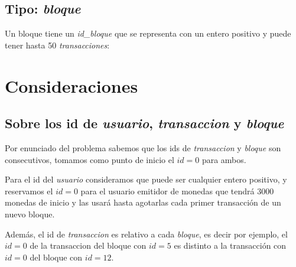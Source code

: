 \documentclass[10pt,a4paper]{article}
\begin{document}
    \subsection{Tipo: \textit{bloque}}
    Un bloque tiene un \textit{id\_bloque} que se representa con un entero positivo y puede tener hasta 50 \textit{transacciones}:

    \vspace{0.3cm}
    \noindent
    \vspace{0.1cm}

    \section{Consideraciones}
    \subsection{Sobre los id de \textit{usuario}, \textit{transaccion} y \textit{bloque}}
    Por enunciado del problema sabemos que los ids de \textit{transaccion} y \textit{bloque} son consecutivos, tomamos como punto de inicio el $id = 0$ para ambos. \par
    Para el id del \textit{usuario} consideramos que puede ser cualquier entero positivo, y reservamos el $id = 0$ para el usuario emitidor de monedas que tendrá 3000 monedas de inicio y las usará hasta agotarlas cada primer transacción de un nuevo bloque. \par
    Además, el id de \textit{transaccion} es relativo a cada \textit{bloque}, es decir por ejemplo, el $id = 0$ de la transaccion del bloque con $id = 5$ es distinto a la transacción con $id = 0$ del bloque con $id = 12$.

    \newpage
\end{document}
